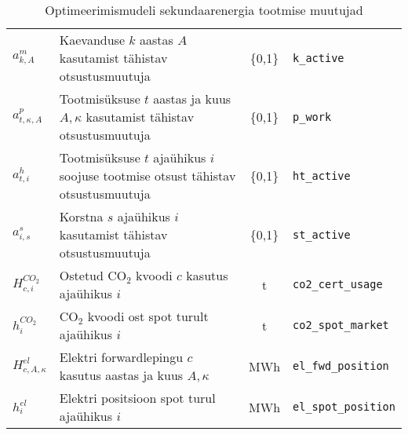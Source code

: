 \begin{landscape}
\begin{table}
\begin{tabular}{l l c l}
$a^{m}_{k, A}$ & Kaevanduse $k$ aastas $A$ kasutamist tähistav otsustusmuutuja & \{0,1\} & \texttt{k\_active} \\
$a^{p}_{t,\kappa, A}$ & Tootmisüksuse $t$ aastas ja kuus $A, \kappa$ kasutamist tähistav otsustusmuutuja & \{0,1\} & \texttt{p\_work} \\

$a^{h}_{t, i}$ & Tootmisüksuse $t$ ajaühikus $i$ soojuse tootmise otsust tähistav otsustusmuutuja & \{0,1\} & \texttt{ht\_active} \\
$a^{s}_{i, s}$ & Korstna $s$ ajaühikus $i$ kasutamist tähistav otsustusmuutuja & \{0,1\} & \texttt{st\_active} \\

$H^{CO_2}_{c,i}$& Ostetud CO$_2$ kvoodi $c$ kasutus ajaühikus $i$ & t & \texttt{co2\_cert\_usage}\\
$h^{CO_2}_{i}$& CO$_2$ kvoodi ost spot turult ajaühikus $i$ & t & \texttt{co2\_spot\_market}\\
$H^{el}_{c,A,\kappa}$ &Elektri forwardlepingu $c$ kasutus aastas ja kuus $A,\kappa$ & MWh & \texttt{el\_fwd\_position}\\
$h^{el}_{i}$ &Elektri positsioon spot turul ajaühikus $i$ & MWh & \texttt{el\_spot\_position}

\end{tabular}
\caption{Optimeerimismudeli sekundaarenergia tootmise muutujad\label{tab:t_muutujad}}
\end{table}
\end{landscape}